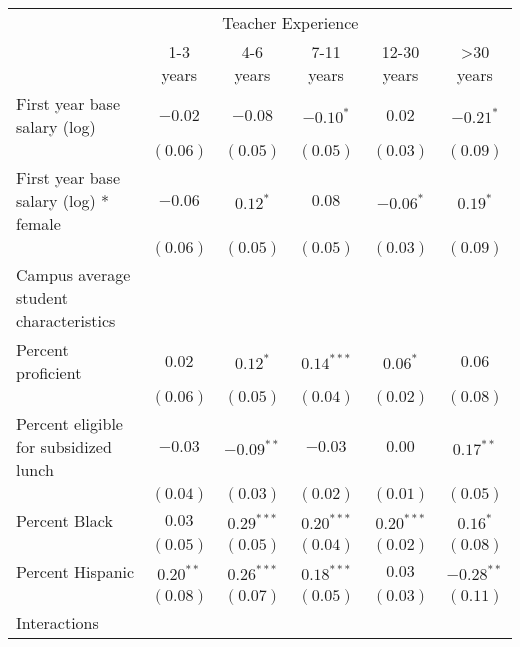 \documentclass[]{article}
\begin{document}
\begin{table}
\begin{center}
\begin{tabular}{l c c c c c }
\hline
 & \multicolumn{4}{c}{Teacher Experience} \\ \cline{2-6}
 & 1-3 years & 4-6 years & 7-11 years & 12-30 years & >30 years \\
\hline
First year base salary (log)                & $-0.02$      & $-0.08$      & $-0.10^{*}$  & $0.02$       & $-0.21^{*}$  \\
                                            & $(0.06)$     & $(0.05)$     & $(0.05)$     & $(0.03)$     & $(0.09)$     \\
First year base salary (log) * female       & $-0.06$      & $0.12^{*}$   & $0.08$       & $-0.06^{*}$  & $0.19^{*}$   \\
                                            & $(0.06)$     & $(0.05)$     & $(0.05)$     & $(0.03)$     & $(0.09)$     \\
Campus average student characteristics      &              &              &              &              &              \\
\quad Percent proficient                    & $0.02$       & $0.12^{*}$   & $0.14^{***}$ & $0.06^{*}$   & $0.06$       \\
                                            & $(0.06)$     & $(0.05)$     & $(0.04)$     & $(0.02)$     & $(0.08)$     \\
\quad Percent eligible for subsidized lunch & $-0.03$      & $-0.09^{**}$ & $-0.03$      & $0.00$       & $0.17^{**}$  \\
                                            & $(0.04)$     & $(0.03)$     & $(0.02)$     & $(0.01)$     & $(0.05)$     \\
\quad Percent Black                         & $0.03$       & $0.29^{***}$ & $0.20^{***}$ & $0.20^{***}$ & $0.16^{*}$   \\
                                            & $(0.05)$     & $(0.05)$     & $(0.04)$     & $(0.02)$     & $(0.08)$     \\
\quad Percent Hispanic                      & $0.20^{**}$  & $0.26^{***}$ & $0.18^{***}$ & $0.03$       & $-0.28^{**}$ \\
                                            & $(0.08)$     & $(0.07)$     & $(0.05)$     & $(0.03)$     & $(0.11)$     \\
Interactions                                &              &              &              &              &              \\

\end{tabular}
\end{center}
\end{table}
\end{document}
